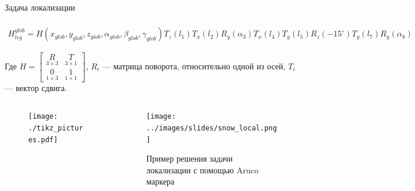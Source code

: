 \begin{frame}[t]{Задача локализации}
\framesubtitle{}
\begin{align}
        H_{leg}^{glob} = H(x_{glob},y_{glob},z_{glob},\alpha_{glob},\beta_{glob},\gamma_{glob})T_z(l_1)T_x(l_2)R_y(\alpha_3)T_x(l_4)T_y(l_5)R_z(-15^{\circ})T_y(l_7)R_y(\alpha_8)
\end{align}

\vspace{-0.3cm}
Где $H = \begin{bmatrix}
    \underset{3 \times 3}{R} & \underset{3 \times 1}{T} \\
    \underset{1 \times 3}{0} & \underset{1 \times 1}{1}
\end{bmatrix}$, $R_i$ --- матрица поворота, относительно одной из осей, $T_i$ --- вектор сдвига.

    \begin{columns}[T,onlytextwidth]
        \begin{column}{0.69\textwidth}
            
            \vspace{-0.3cm}
            \begin{figure}[H]
        \centering
        \centering\texttt{[image: ./tikz\_pictures.pdf]}
    \end{figure}
        \end{column}
        \begin{column}{0.29\textwidth}
            \begin{figure}[H]
                \centering\texttt{[image: ../images/slides/snow\_local.png]}
                \caption{Пример решения задачи локализации с помощью Aruco маркера}
            \end{figure}
        \end{column}
    \end{columns}
\end{frame}


